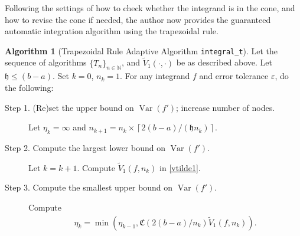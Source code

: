 \documentclass{iitthesis}
\DeclareMathOperator{\Var}{Var}
\theoremstyle{definition}
\newtheorem{algo}{Algorithm}
\theoremstyle{remark}
\begin{document}
Following the settings of how to check whether the integrand is in the cone, and how to revise the cone if needed, the author now provides the guaranteed automatic integration algorithm using the trapezoidal rule.
\begin{algo}[Trapezoidal Rule Adaptive Algorithm {\tt integral\_t}] \label{multistagetrapalgo}
Let the sequence of algorithms $\{T_n\}_{n\in \mathbb{N}}$, %
and $\widetilde{V}_1(\cdot,\cdot)$ be as described above.
Let $\mathfrak{h}\le (b-a)$. Set $k=0$, $n_{k}=1$. For any integrand $f$ and error tolerance $\varepsilon$, do the following: %
\begin{description}
\item[Step 1. (Re)set the upper bound on $\Var(f')$; increase number of nodes.] Let $\eta_{k}=\infty$ and $n_{k+1}=n_k\times\left\lceil2(b-a)/(\mathfrak{h}n_{k})\right\rceil$.

\item[Step 2. Compute the largest lower bound on {$\Var(f')$}.] Let $k=k+1$. Compute  $\widetilde{V}_1(f,n_k)$ in \eqref{vtilde1}.%

\item[Step 3. Compute the smallest upper bound on {$\Var(f')$}.] Compute
    \begin{align*}
        \eta_{k}=\min\left(\eta_{k-1},\mathfrak{C}(2(b-a)/n_{k})\widetilde{V}_1(f,n_k)\right).
    \end{align*}


\end{description}
\end{algo}
\end{document}
